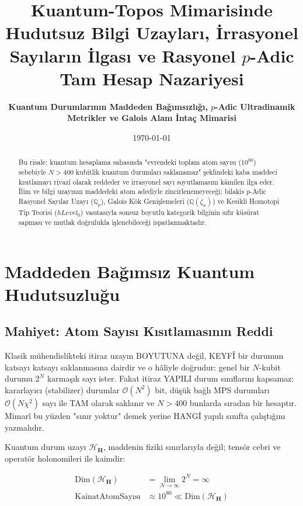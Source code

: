 \documentclass[11pt, a4paper]{article}
\title{\textbf{Kuantum-Topos Mimarisinde Hudutsuz Bilgi Uzayları, İrrasyonel Sayıların İlgası ve Rasyonel $p$-Adic Tam Hesap Nazariyesi}}
\author{\textbf{Kuantum Durumlarının Maddeden Bağımsızlığı, $p$-Adic Ultradinamik Metrikler ve Galois Alanı İntaç Mimarisi}}
\date{\today}
\begin{document}
\maketitle

\begin{abstract}
Bu risale; kuantum hesaplama sahasında "evrendeki toplam atom sayısı ($10^{80}$) sebebiyle $N > 400$ kubitlik kuantum durumları saklanamaz" şeklindeki kaba maddeci kısıtlamayı riyazî olarak reddeder ve irrasyonel sayı soyutlamasını kâmilen ilga eder. İlim ve bilgi uzayının maddedeki atom adediyle zincirlenemeyeceği; bilakis $p$-Adic Rasyonel Sayılar Uzayı ($\mathbb{Q}_p$), Galois Kök Genişlemeleri ($\mathbb{Q}(\zeta_n)$) ve Kesikli Homotopi Tip Teorisi ($hLevel_0$) vasıtasıyla sonsuz boyutlu kategorik bilginin sıfır küsürat sapması ve mutlak doğrulukla işlenebileceği ispatlanmaktadır.
\end{abstract}

\tableofcontents
\newpage

\section{Maddeden Bağımsız Kuantum Hudutsuzluğu}

\subsection{Mahiyet: Atom Sayısı Kısıtlamasının Reddi}
Klasik mühendislikteki itiraz uzayın BOYUTUNA değil, KEYFÎ bir durumun katsayı katsayı saklanmasına dairdir ve o hâliyle doğrudur: genel bir $N$-kubit durumu $2^N$ karmaşık sayı ister. Fakat itiraz YAPILI durum sınıflarını kapsamaz: kararlayıcı (stabilizer) durumlar $\mathcal{O}(N^2)$ bit, düşük bağlı MPS durumları $\mathcal{O}(N \chi^2)$ sayı ile TAM olarak saklanır ve $N > 400$ bunlarda sıradan bir hesaptır. Mimarî bu yüzden "sınır yoktur" demek yerine HANGİ yapılı sınıfta çalıştığını yazmalıdır. 

Kuantum durum uzayı $\mathcal{H}_{\mathbf{H}}$, maddenin fiziki sınırlarıyla değil; tensör cebri ve operatör holonomileri ile kaimdir:

\begin{align}
\text{Dim}(\mathcal{H}_{\mathbf{H}}) &= \lim_{N \to \infty} 2^N = \infty \\
\text{KainatAtomSayısı} &\approx 10^{80} \ll \text{Dim}(\mathcal{H}_{\mathbf{H}})
\end{align}
\end{document}
